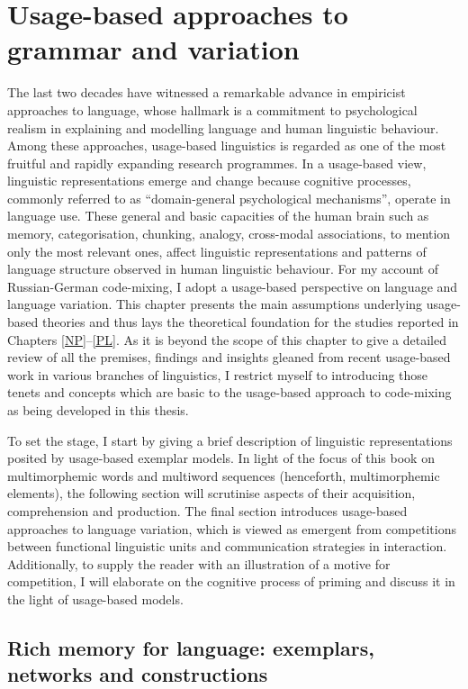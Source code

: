 \chapter{Usage-based approaches to grammar and variation}\label{UBL}

The last two decades have witnessed a remarkable advance in empiricist approaches to language, whose hallmark is a commitment to psychological realism in explaining and modelling language and human linguistic behaviour. Among these approaches, usage-based linguistics is regarded as one of the most fruitful and rapidly expanding research programmes. In a usage-based view, linguistic representations emerge and change because cognitive processes, commonly referred to as “domain-general psychological mechanisms”, operate in language use. These general and basic capacities of the human brain such as memory, categorisation, chunking, analogy, cross-modal associations, to mention only the most relevant ones, affect linguistic representations and patterns of language structure observed in human linguistic behaviour. For my account of Russian-German code-mixing, I adopt a usage-based perspective on language and language variation. This chapter presents the main assumptions underlying usage-based theories and thus lays the theoretical foundation for the studies reported in Chapters \ref{NP}--\ref{PL}. As it is beyond the scope of this chapter to give a detailed review of all the premises, findings and insights gleaned from recent usage-based work in various branches of linguistics, I restrict myself to introducing those tenets and concepts  which are basic to the usage-based approach to code-mixing as being developed in this thesis. 

To set the stage, I start by giving a brief description of linguistic representations posited by usage-based exemplar models. In light of the focus of this book on multimorphemic words and multiword sequences (henceforth, multimorphemic elements), the following section will scrutinise aspects of their acquisition, comprehension and production. The final section introduces usage-based approaches to language variation, which is viewed as emergent from competitions between functional linguistic units and communication strategies in interaction. Additionally, to supply the reader with an illustration of a motive for competition, I will elaborate on the cognitive process of priming and discuss it in the light of usage-based models.

\section{Rich memory for language: exemplars, networks and constructions}
\label{sec:exemplars}

